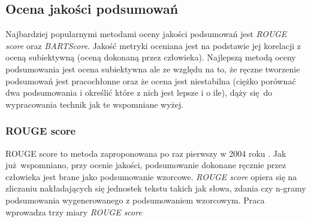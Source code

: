 \documentclass{article}
\begin{document}
\subsection{Ocena jakości podsumowań}
Najbardziej popularnymi metodami oceny jakości podsumowań jest \textit{ROUGE score} oraz
\textit{BARTScore}. Jakość metryki oceniana jest na podstawie jej korelacji z oceną
subiektywną (oceną dokonaną przez człowieka). Najlepszą metodą oceny podsumowania jest 
ocena subiektywna ale ze względu na to, że ręczne tworzenie podsumowań jest pracochłonne oraz że
ocena jest niestabilna (ciężko porównać dwa podsumowania i określić które z nich jest lepsze
i o ile), dąży się do wypracowania technik jak te wspomniane wyżej. 

\subsubsection{ROUGE score}
ROUGE score to metoda zaproponowana po raz pierwszy w 2004 roku \cite{lin2004rouge}. Jak już wspomniano,
przy ocenie jakości, podsumowanie dokonane ręcznie przez człowieka jest brane jako podsumowanie
wzorcowe. \textit{ROUGE score} opiera się na zliczaniu nakładających się jednostek tekstu takich jak
słowa, zdania czy n-gramy podsumowania wygenerowanego z podsumowaniem wzorcowym. Praca \cite{lin2004rouge}
wprowadza trzy miary \textit{ROUGE score}
\end{document}
